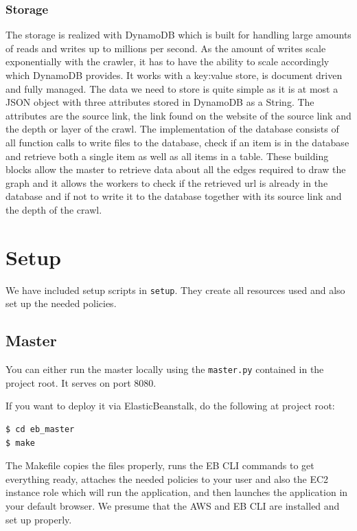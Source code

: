 \documentclass[english]{scrartcl}
\begin{document}
\subsubsection{Storage}

The storage is realized with DynamoDB which is built for handling large amounts of reads and writes up to millions per second.
As the amount of writes scale exponentially with the crawler, it has to have the ability to scale accordingly which DynamoDB provides.
It works with a key:value store, is document driven and fully managed.
The data we need to store is quite simple as it is at most a JSON object with three attributes stored in DynamoDB as a String.
The attributes are the source link, the link found on the website of the source link and the depth or layer of the crawl.
The implementation of the database consists of all function calls to write files to the database, check if an item is in the database and
retrieve both a single item as well as all items in a table. These building blocks allow the master to retrieve data about all the edges
required to draw the graph and it allows the workers to check if the retrieved url is already in the database and if not to write it to the
database together with its source link and the depth of the crawl.

\section{Setup}

We have included setup scripts in \texttt{setup}. They create all resources
used and also set up the needed policies. %

\subsection{Master}

You can either run the master locally using the \texttt{master.py} contained
in the project root. It serves on port 8080.

If you want to deploy it via ElasticBeanstalk, do the following at project
root:

\begin{verbatim}
$ cd eb_master
$ make
\end{verbatim}

The Makefile copies the files properly, runs the EB CLI commands to get
everything ready, attaches the needed policies to your user and also the EC2
instance role which will run the application, and then launches the application
in your default browser. We presume that the AWS and EB CLI are installed and
set up properly.
\end{document}
